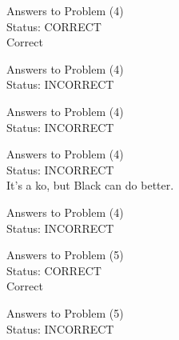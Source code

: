\documentclass[11pt]{article}
\begin{document}
\begin{minipage}[t]{0.5\textwidth}
  {\centering
  
  Answers to Problem (4)\\
  Status: CORRECT\\
  Correct\\
  }
\end{minipage}
\begin{minipage}[t]{0.5\textwidth}
  {\centering
  
  Answers to Problem (4)\\
  Status: INCORRECT\\
  
  }
\end{minipage}
\begin{minipage}[t]{0.5\textwidth}
  {\centering
  
  Answers to Problem (4)\\
  Status: INCORRECT\\
  
  }
\end{minipage}
\begin{minipage}[t]{0.5\textwidth}
  {\centering
  
  Answers to Problem (4)\\
  Status: INCORRECT\\
  It's a ko, but Black can do better.\\
  }
\end{minipage}
\begin{minipage}[t]{0.5\textwidth}
  {\centering
  
  Answers to Problem (4)\\
  Status: INCORRECT\\
  
  }
\end{minipage}
\begin{minipage}[t]{0.5\textwidth}
  {\centering
  
  Answers to Problem (5)\\
  Status: CORRECT\\
  Correct\\
  }
\end{minipage}
\begin{minipage}[t]{0.5\textwidth}
  {\centering
  
  Answers to Problem (5)\\
  Status: INCORRECT\\
  
  }
\end{minipage}
\end{document}
